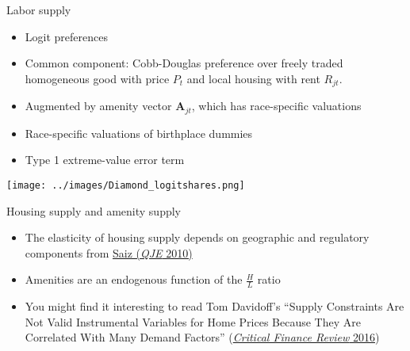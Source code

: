 \documentclass[10pt,notes=hide]{beamer}
\begin{document}
\begin{frame}{Labor supply}
\begin{itemize}
	\item Logit preferences
	\item Common component: Cobb-Douglas preference over freely traded homogeneous good with price $P_t$ and local housing with rent $R_{jt}$.
	\item Augmented by amenity vector $\mathbf{A}_{jt}$, which has race-specific valuations
	\item Race-specific valuations of birthplace dummies
	\item Type 1 extreme-value error term
\end{itemize}
\begin{center}
\texttt{[image: ../images/Diamond\_logitshares.png]}
\end{center}
\end{frame}
\begin{frame}{Housing supply and amenity supply}
\begin{itemize}
	\item The elasticity of housing supply depends on geographic and regulatory components from \href{https://doi.org/10.1162/qjec.2010.125.3.1253}{Saiz (\textit{QJE} 2010)}
	\item Amenities are an endogenous function of the $\frac{H}{L}$ ratio
	\item You might find it interesting to read Tom Davidoff's ``Supply Constraints Are Not Valid Instrumental Variables for Home Prices Because They Are Correlated With Many Demand Factors'' (\href{https://www.nowpublishers.com/article/Details/CFR-0037}{\textit{Critical Finance Review} 2016})
\end{itemize}
\end{frame}
\end{document}
